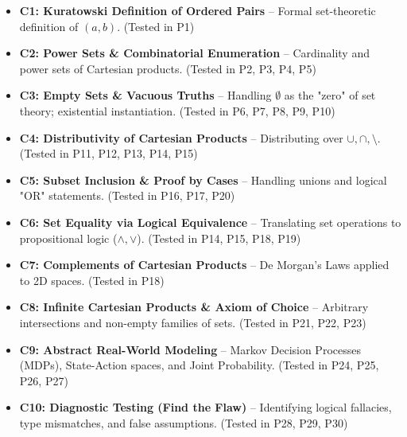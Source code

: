 \documentclass[11pt]{article}
\begin{document}
\begin{itemize}
    \item \textbf{C1: Kuratowski Definition of Ordered Pairs} -- Formal set-theoretic definition of $(a,b)$. (Tested in P1)
    \item \textbf{C2: Power Sets \& Combinatorial Enumeration} -- Cardinality and power sets of Cartesian products. (Tested in P2, P3, P4, P5)
    \item \textbf{C3: Empty Sets \& Vacuous Truths} -- Handling $\emptyset$ as the "zero" of set theory; existential instantiation. (Tested in P6, P7, P8, P9, P10)
    \item \textbf{C4: Distributivity of Cartesian Products} -- Distributing over $\cup, \cap, \setminus$. (Tested in P11, P12, P13, P14, P15)
    \item \textbf{C5: Subset Inclusion \& Proof by Cases} -- Handling unions and logical "OR" statements. (Tested in P16, P17, P20)
    \item \textbf{C6: Set Equality via Logical Equivalence} -- Translating set operations to propositional logic ($\land, \lor$). (Tested in P14, P15, P18, P19)
    \item \textbf{C7: Complements of Cartesian Products} -- De Morgan's Laws applied to 2D spaces. (Tested in P18)
    \item \textbf{C8: Infinite Cartesian Products \& Axiom of Choice} -- Arbitrary intersections and non-empty families of sets. (Tested in P21, P22, P23)
    \item \textbf{C9: Abstract Real-World Modeling} -- Markov Decision Processes (MDPs), State-Action spaces, and Joint Probability. (Tested in P24, P25, P26, P27)
    \item \textbf{C10: Diagnostic Testing (Find the Flaw)} -- Identifying logical fallacies, type mismatches, and false assumptions. (Tested in P28, P29, P30)
\end{itemize}
\end{document}
